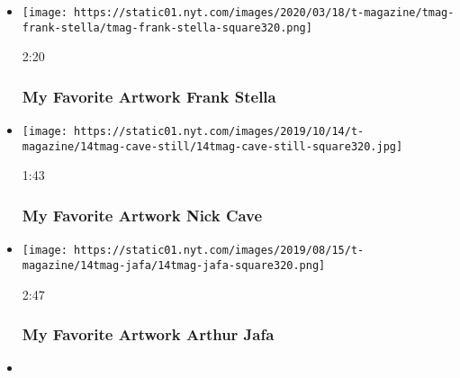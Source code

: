 \begin{itemize}
\item
  \href{https://www.nytimes.com/video/t-magazine/100000007025848/my-favorite-artwork-frank-stella.html?action=click\&module=video-series-bar\&region=header\&pgtype=Article\&playlistId=video/my-favorite-artwork}{}

  \texttt{[image: https://static01.nyt.com/images/2020/03/18/t-magazine/tmag-frank-stella/tmag-frank-stella-square320.png]}

  2:20

  \hypertarget{my-favorite-artwork--frank-stella}{%
  \subsubsection{My Favorite Artwork \textbar{} Frank
  Stella}\label{my-favorite-artwork--frank-stella}}
\item
  \href{https://www.nytimes.com/video/t-magazine/100000006761493/nick-cave-barkley-hendricks.html?action=click\&module=video-series-bar\&region=header\&pgtype=Article\&playlistId=video/my-favorite-artwork}{}

  \texttt{[image: https://static01.nyt.com/images/2019/10/14/t-magazine/14tmag-cave-still/14tmag-cave-still-square320.jpg]}

  1:43

  \hypertarget{my-favorite-artwork--nick-cave}{%
  \subsubsection{My Favorite Artwork \textbar{} Nick
  Cave}\label{my-favorite-artwork--nick-cave}}
\item
  \href{https://www.nytimes.com/video/t-magazine/100000006654997/my-favorite-artwork-arthur-jafa.html?action=click\&module=video-series-bar\&region=header\&pgtype=Article\&playlistId=video/my-favorite-artwork}{}

  \texttt{[image: https://static01.nyt.com/images/2019/08/15/t-magazine/14tmag-jafa/14tmag-jafa-square320.png]}

  2:47

  \hypertarget{my-favorite-artwork--arthur-jafa}{%
  \subsubsection{My Favorite Artwork \textbar{} Arthur
  Jafa}\label{my-favorite-artwork--arthur-jafa}}
\item
  \href{https://www.nytimes.com/video/t-magazine/100000006512916/my-favorite-artwork-jordan-casteel.html?action=click\&module=video-series-bar\&region=header\&pgtype=Article\&playlistId=video/my-favorite-artwork}{}


\end{itemize}

